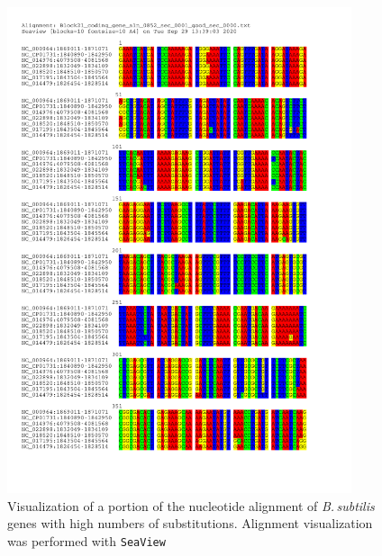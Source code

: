 \documentclass[11pt]{article}
\newcommand{\bass}{\textit{B.\,subtilis}\xspace}
\begin{document}
\newpage
\newpage

\begin{figure}[H]
	\begin{center}
		\includegraphics[width=0.9\textwidth]{./figs/Bacillus_high_substitutions_gene_example_nucleotide_alignment.pdf}
		\caption{\label{fig:nucaln} Visualization of a portion of the nucleotide alignment of \bass genes with high numbers of substitutions. Alignment visualization was performed with \texttt{SeaView} \citep{Gouy:10}}
	\end{center}
\end{figure}

\newpage
\end{document}
